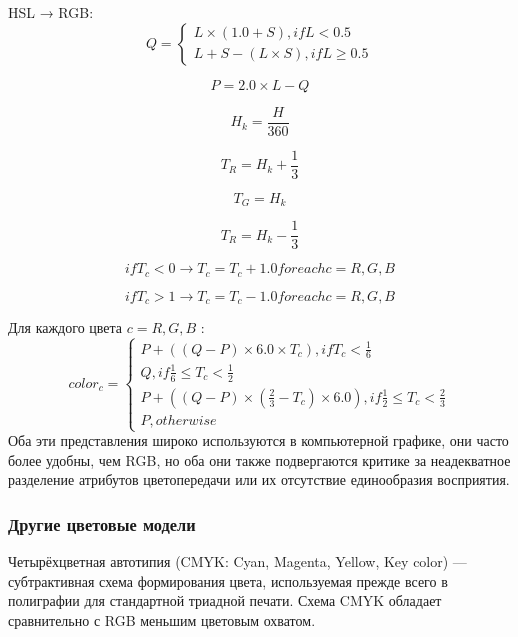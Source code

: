 HSL → RGB: \\
 \begin{equation}
Q={\begin{cases} L \times (1.0 + S), if L < 0.5 \\
	L + S - (L\times S), if L \geq 0.5
	\end{cases}}
\end{equation}

\begin{equation}
P = 2.0 \times L - Q
\end{equation}

\begin{equation}
H_{k} = \frac{H}{360}
\end{equation}

\begin{equation}
T_{R} = H_{k} + \frac{1}{3}
\end{equation}

\begin{equation}
T_{G} = H_{k}
\end{equation}

\begin{equation}
T_{R} = H_{k} - \frac{1}{3}
\end{equation}

\begin{equation}
if T_{c} < 0  → T_{c} = T_{c} + 1.0 for 	each 	 c = R,G,B
\end{equation}


\begin{equation}
if T_{c} > 1 → T_{c} = T_{c} - 1.0 for each  c = R,G,B
\end{equation}

Для каждого цвета $c=R,G,B$ :
\begin{equation}
color_{c}={\begin{cases} P+((Q-P) \times 6.0 \times T_{c}), if T_{c} <\frac{1}{6} \\
	Q, if \frac{1}{6} \leq T_{c} < \frac{1}{2} \\
	P + ((Q-P)\times (\frac{2}{3} -T_{c}) \times 6.0), if \frac{1}{2} \leq T_{c} < \frac{2}{3} \\
	P, otherwise
	\end{cases}}
\end{equation}
Оба эти представления широко используются в компьютерной графике, они часто более удобны, чем RGB, но оба они также подвергаются критике за неадекватное разделение атрибутов цветопередачи или их отсутствие единообразия восприятия.
\subsubsection{Другие цветовые модели}
Четырёхцветная автотипия (CMYK: Cyan, Magenta, Yellow, Key color) \cite{bib6} — субтрактивная схема формирования цвета, используемая прежде всего в полиграфии для стандартной триадной печати. Схема CMYK обладает сравнительно с RGB меньшим цветовым охватом.


